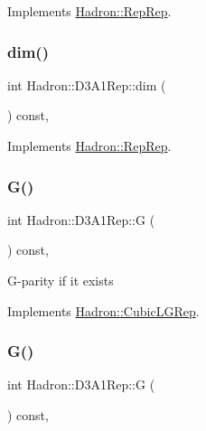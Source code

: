 Implements \mbox{\hyperlink{structHadron_1_1RepRep_a92c8802e5ed7afd7da43ccfd5b7cd92b}{Hadron\+::\+Rep\+Rep}}.

\mbox{\label{structHadron_1_1D3A1Rep_abb120c31183935cf98330a4085ff6b1c}} 
\subsubsection{\texorpdfstring{dim()}{dim()}\hspace{0.1cm}{\footnotesize\ttfamily [3/3]}}
{\footnotesize\ttfamily int Hadron\+::\+D3\+A1\+Rep\+::dim (\begin{DoxyParamCaption}{ }\end{DoxyParamCaption}) const\hspace{0.3cm}{\ttfamily [inline]}, {\ttfamily [virtual]}}



Implements \mbox{\hyperlink{structHadron_1_1RepRep_a92c8802e5ed7afd7da43ccfd5b7cd92b}{Hadron\+::\+Rep\+Rep}}.

\mbox{\label{structHadron_1_1D3A1Rep_a4ad1cf7ca7e11dccb203e9ed21aa11c6}} 
\subsubsection{\texorpdfstring{G()}{G()}\hspace{0.1cm}{\footnotesize\ttfamily [1/2]}}
{\footnotesize\ttfamily int Hadron\+::\+D3\+A1\+Rep\+::G (\begin{DoxyParamCaption}{ }\end{DoxyParamCaption}) const\hspace{0.3cm}{\ttfamily [inline]}, {\ttfamily [virtual]}}

G-\/parity if it exists 

Implements \mbox{\hyperlink{structHadron_1_1CubicLGRep_ace26f7b2d55e3a668a14cb9026da5231}{Hadron\+::\+Cubic\+L\+G\+Rep}}.

\mbox{\label{structHadron_1_1D3A1Rep_a4ad1cf7ca7e11dccb203e9ed21aa11c6}} 
\subsubsection{\texorpdfstring{G()}{G()}\hspace{0.1cm}{\footnotesize\ttfamily [2/2]}}
{\footnotesize\ttfamily int Hadron\+::\+D3\+A1\+Rep\+::G (\begin{DoxyParamCaption}{ }\end{DoxyParamCaption}) const\hspace{0.3cm}{\ttfamily [inline]}, {\ttfamily [virtual]}}

